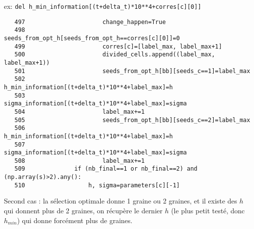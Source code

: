 \documentclass{article}
\def \mycolor {red}
\begin{document}
ex: \verb|del h_min_information[(t+delta_t)*10**4+corres[c][0]]|

\color{black}
\begin{verbatim} 
   497	                    change_happen=True
   498	                    seeds_from_opt_h[seeds_from_opt_h==corres[c][0]]=0
   499	                    corres[c]=[label_max, label_max+1]
   500	                    divided_cells.append((label_max, label_max+1))
   501	                    seeds_from_opt_h[bb][seeds_c==1]=label_max
   502	                    h_min_information[(t+delta_t)*10**4+label_max]=h
   503	                    sigma_information[(t+delta_t)*10**4+label_max]=sigma
   504	                    label_max+=1
   505	                    seeds_from_opt_h[bb][seeds_c==2]=label_max
   506	                    h_min_information[(t+delta_t)*10**4+label_max]=h
   507	                    sigma_information[(t+delta_t)*10**4+label_max]=sigma
   508	                    label_max+=1
   509	            if (nb_final==1 or nb_final==2) and (np.array(s)>2).any():
   510	                h, sigma=parameters[c][-1]
\end{verbatim} 
\color{\mycolor}
Second cas : la s\'election optimale donne 1 graine ou 2 graines, et il existe des $h$ qui donnent plus de 2 graines, on r\'ecup\`ere le dernier $h$ (le plus petit test\'e, donc $h_{min}$) qui donne forc\'ement plus de graines. 
\end{document}
